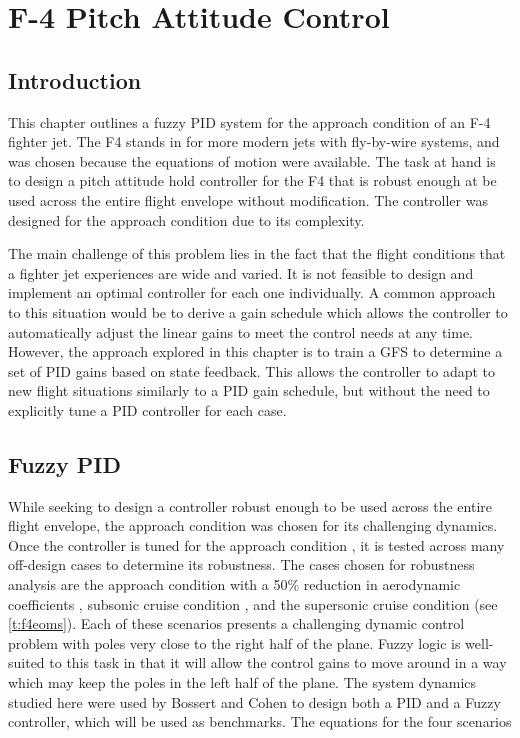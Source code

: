 \chapter{F-4 Pitch Attitude Control}\label{c:f4}
\section{Introduction} 

This chapter outlines a fuzzy PID system for the approach condition of an F-4 fighter jet. The F4 stands in
for more modern jets with fly-by-wire systems, and was chosen because the equations of motion were available.
The task at hand is to design a pitch attitude hold controller for the F4 that is robust
enough at be used across the entire flight envelope without modification. The controller was designed for the
approach condition due to its complexity.

The main challenge of this problem lies in the fact that the flight conditions that a
fighter jet experiences are wide and varied. It is not feasible to design and implement an optimal
controller for each one individually. A common approach to this situation would be to derive a gain schedule which
allows the controller to automatically adjust the linear gains to meet the control needs at any time. However,
the
approach explored in this chapter is to train a GFS to determine a set of PID gains based on state feedback.
This allows the controller to adapt to new flight situations similarly to a PID gain schedule, but without the
need to explicitly tune a PID controller for each case.

\section{Fuzzy PID} While seeking to design a controller robust enough to be used across the entire flight
envelope, the approach condition was chosen for its challenging dynamics. Once the controller is tuned for the
approach condition , it is tested across many off-design cases to determine its
robustness. The cases chosen for robustness analysis are the approach condition with a 50\% reduction in
aerodynamic coefficients , subsonic cruise condition , and the
supersonic cruise condition (see \cref{t:f4eoms}). Each of these scenarios presents a challenging dynamic
control problem with poles very close to the right half of the plane. Fuzzy logic is well-suited to this task
in that it will allow the control gains to move around in a way which may keep the poles in the left half of
the plane. The system dynamics studied here were used by Bossert and Cohen\cite{bossert2002pid} to design both 
a PID and a Fuzzy controller, which will be used as benchmarks. The equations for the four scenarios

